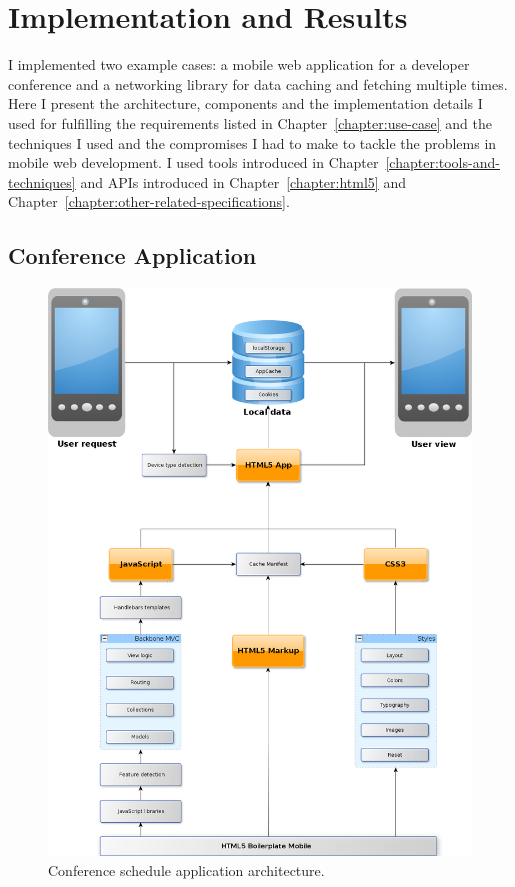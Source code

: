 \chapter{Implementation and Results}
\label{chapter:implementation}

I implemented two example cases: a mobile web application for a
developer conference and a networking library for data caching and
fetching multiple times. Here I present the architecture, components
and the implementation details I used for fulfilling the requirements
listed in Chapter~\ref{chapter:use-case} and the techniques I used and
the compromises I had to make to tackle the problems in mobile web
development. I used tools introduced in
Chapter~\ref{chapter:tools-and-techniques} and APIs introduced in
Chapter~\ref{chapter:html5} and
Chapter~\ref{chapter:other-related-specifications}.

\section{Conference Application}

\begin{figure}[h!]
  \begin{center}
    \includegraphics[width=\textwidth]{images/devdays.png}
    \caption{Conference schedule application architecture.}
    \label{figure:devdays.png}
  \end{center}
\end{figure}

